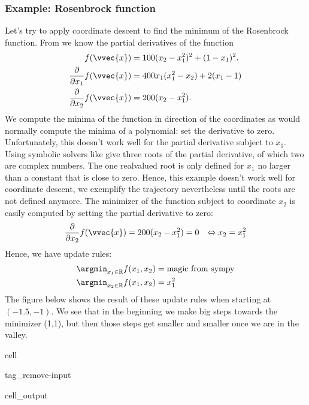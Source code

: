 \documentclass[letterpaper,10pt,english]{jupyterBook}
\begin{document}
\subsubsection{Example: Rosenbrock function}
\label{\detokenize{optimization_numerical:example-rosenbrock-function}}
\sphinxAtStartPar
Let’s try to apply coordinate descent to find the minimum of the Rosenbrock function. From {\hyperref[\detokenize{optimization_analytic:expl_fonc}]{}} we know the partial derivatives of the function
\begin{align*}
    f(\vvec{x})&= 100(x_2-x_1^2)^2 +(1-x_1)^2.\\
    \frac{\partial}{\partial x_1}f(\vvec{x})&= 400x_1(x_1^2-x_2) +2(x_1-1)\\
    \frac{\partial}{\partial x_2}f(\vvec{x})&= 200(x_2-x_1^2).
\end{align*}
\sphinxAtStartPar
We compute the minima of the function in direction of the coordinates as would normally compute the minima of a polynomial: set the derivative to zero. Unfortunately, this doesn’t work well for the partial derivative subject to \(x_1\). Using symbolic solvers like  give three roots of the partial derivative, of which two are complex numbers. The one real\sphinxhyphen{}valued root is only defined for \(x_1\) no larger than a constant that is close to zero. Hence, this example doesn’t work well for coordinate descent, we exemplify the trajectory nevertheless until the roots are not defined anymore. The minimizer of the function subject to coordinate \(x_2\) is easily computed by setting the partial derivative to zero:
\begin{align*}
      \frac{\partial}{\partial x_2}f(\vvec{x})&=200(x_2-x_1^2)=0
      &\Leftrightarrow x_2 =x_1^2
\end{align*}
\sphinxAtStartPar
Hence, we have update rules:
\begin{align*}
    \argmin_{x_1\in\mathbb{R}} f(x_1,x_2) &=\text{magic from sympy} \\
    \argmin_{x_2\in\mathbb{R}} f(x_1,x_2) &=x_1^2
\end{align*}
\sphinxAtStartPar
The figure below shows the result of these update rules when starting at \((-1.5,-1)\). We see that in the beginning we make big steps towards the minimizer (1,1), but then those steps get smaller and smaller once we are in the valley.

\begin{sphinxuseclass}{cell}
\begin{sphinxuseclass}{tag_remove-input}\begin{sphinxVerbatimOutput}

\begin{sphinxuseclass}{cell_output}
\noindent{}

\end{sphinxuseclass}\end{sphinxVerbatimOutput}

\end{sphinxuseclass}
\end{sphinxuseclass}
\end{document}
